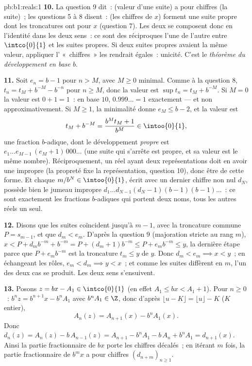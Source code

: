 \begin{solution}{pb:b1:reals:1}
\textbf{10.} La question 9 dit~: (valeur d'une suite) a pour
chiffres (la suite)~; les questions 5 à 8 disent~: (les chiffres de
$x$) forment une suite propre dont les troncatures ont pour  $x$ (question 7). Les deux  se composent
donc en l'identité dans les deux sens~: ce sont des 
réciproques l'une de l'autre entre $\intco{0}{1}$ et les suites
propres. Si deux suites propres avaient la même valeur, appliquer
l' «~chiffres~» les rendrait égales~: unicité. C'est le
\emph{théorème du développement en base $b$}.

\textbf{11.} Soit $e_n = b - 1$ pour $n > M$, avec $M \geq 0$
minimal. Comme à la question 8, $t_n = t_M + b^{-M} - b^{-n}$ pour
$n \geq M$, donc la valeur est $\sup t_n = t_M + b^{-M}$. Si $M =
0$ la valeur est $0 + 1 = 1$~: en base $10$, $0.999\dots = 1$
exactement --- et non approximativement. Si $M \geq 1$, la
minimalité donne $e_M \leq b - 2$, et la valeur est
\[
t_M + b^{-M} = \frac{b^M t_M + 1}{b^M} \in \intoo{0}{1},
\]
une fraction $b$-adique, dont le développement \emph{propre} est
$e_1 \dots e_{M-1}\,(e_M + 1)\,000\dots$ (une suite qui s'arrête
est propre, et sa valeur est le même nombre). Réciproquement, un
réel ayant deux représentations doit en avoir une impropre (la
propreté fixe la représentation, question 10), donc être de cette
forme. Et chaque $m/b^N \in \intoo{0}{1}$, écrit avec un dernier
chiffre non nul $d_N$, possède bien le jumeau impropre $d_1 \dots
d_{N-1}(d_N - 1)(b-1)(b-1)\dots$~: ce sont exactement les fractions
$b$-adiques qui portent deux noms, tous les autres réels un seul.

\textbf{12.} Disons que les suites coïncident jusqu'à $m - 1$, avec
la troncature commune $P = s_{m-1}$, et que $d_m < e_m$. D'après la
question 9 (majoration stricte au rang $m$), $x < P + d_m b^{-m} +
b^{-m} = P + (d_m + 1)b^{-m} \leq P + e_m b^{-m} \leq y$, la
dernière étape parce que $P + e_m b^{-m}$ est la troncature $t_m
\leq y$ de $y$. Donc $d_m < e_m \implies x < y$~; en échangeant les
rôles, $e_m < d_m \implies y < x$~; et comme les suites diffèrent
en $m$, l'un des deux cas se produit. Les deux sens s'ensuivent.

\textbf{13.} Posons $z = bx - A_1 \in \intco{0}{1}$ (en effet $A_1
\leq bx < A_1 + 1$). Pour $n \geq 0$~: $b^n z = b^{n+1} x - b^n
A_1$ avec $b^n A_1 \in \Z$, donc d'après $\lfloor u - K \rfloor =
\lfloor u \rfloor - K$ ($K$ entier),
\[
A_n(z) = A_{n+1}(x) - b^n A_1(x) .
\]
Donc $d_n(z) = A_n(z) - b\,A_{n-1}(z) = A_{n+1} - b^n A_1 -
b\,A_n + b^n A_1 = d_{n+1}(x)$. Ainsi la partie fractionnaire de
$bx$ porte les chiffres décalés~; en itérant $m$ fois, la partie
fractionnaire de $b^m x$ a pour chiffres $(d_{n+m})_{n \geq 1}$.


\end{solution}
